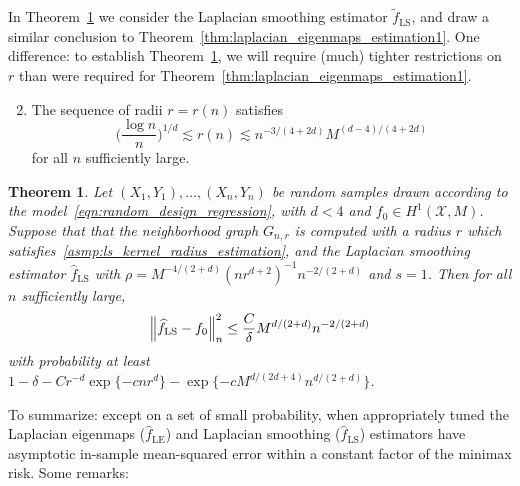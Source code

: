 \documentclass{article}
\newcommand{\1}{\mathbf{1}}
\newcommand{\Xset}{\mathcal{X}}
\newcommand{\wt}[1]{\widetilde{#1}}
\newcommand{\wh}[1]{\widehat{#1}}
\newcommand{\LE}{\mathrm{LE}}
\newcommand{\LS}{\mathrm{LS}}
\theoremstyle{alden}
\theoremstyle{aldenthm}
\newtheorem{theorem}{Theorem}
\theoremstyle{definition}
\theoremstyle{remark}
\begin{document}
In Theorem~\ref{thm:laplacian_smoothing_estimation1} we consider the Laplacian smoothing estimator $\wt{f}_{\LS}$, and draw a similar conclusion to Theorem~\ref{thm:laplacian_eigenmaps_estimation1}. One difference: to establish Theorem~\ref{thm:laplacian_smoothing_estimation1}, we will require (much) tighter restrictions on $r$ than were required for Theorem~\ref{thm:laplacian_eigenmaps_estimation1}.
\begin{enumerate}[label=(R\arabic*)]
	\setcounter{enumi}{1}
	\item 
	\label{asmp:ls_kernel_radius_estimation}
	The sequence of radii $r = r(n)$ satisfies
	\begin{equation*}
	\biggl(\frac{\log n}{n}\biggr)^{1/d} \lesssim r(n) \lesssim n^{-3/(4 + 2d)} M^{(d - 4)/(4 + 2d)}
	\end{equation*}
	for all $n$ sufficiently large.
\end{enumerate}
\begin{theorem}
	\label{thm:laplacian_smoothing_estimation1}
	Let $(X_1,Y_1),\ldots,(X_n,Y_n)$ be random samples drawn according to the model~\eqref{eqn:random_design_regression}, with $d < 4$ and $f_0 \in H^1(\Xset,M)$. Suppose that that the neighborhood graph $G_{n,r}$ is computed with a radius $r$ which satisfies~\ref{asmp:ls_kernel_radius_estimation},  and the Laplacian smoothing estimator $\wh{f}_{\LS}$ with $\rho = M^{-4/(2 + d)} (nr^{d + 2})^{-1} n^{-2/(2 + d)}$ and $s = 1$. Then for all $n$ sufficiently large,
	\begin{equation*}
	\Bigl\|\wh{f}_{\LS} - f_0\Bigr\|_n^2 \leq \frac{C}{\delta} M^{d/(2 + d)} n^{-2/(2 + d)}
	\end{equation*}
	with probability at least $1 - \delta -  Cr^{-d}\exp\{-cnr^d\} - \exp\{-c M^{d/(2d + 4)} n^{d/(2+d)}\}$.
\end{theorem}
To summarize: except on a set of small probability, when appropriately tuned the Laplacian eigenmaps ($\wh{f}_{\LE}$) and Laplacian smoothing ($\wh{f}_{\LS}$) estimators have asymptotic in-sample mean-squared error within a constant factor of the minimax risk. Some remarks:
\end{document}
